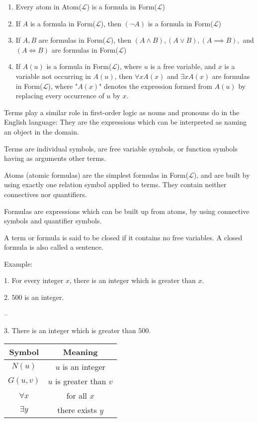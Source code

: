 \documentclass{article}
\begin{document}
\begin{enumerate}
    \item Every atom in Atom($\mathcal{L}$) is a formula in Form($\mathcal{L}$)
    \item If $A$ is a formula in Form($\mathcal{L}$), then $(\neg A)$ is a formula in Form($\mathcal{L}$)
    \item If $A, B$ are formulas in Form($\mathcal{L}$), then $(A \wedge B), (A \vee B), (A \implies B),$ and $(A \iff B)$ are formulas in Form($\mathcal{L}$)
    \item If $A(u)$ is a formula in Form($\mathcal{L}$), where $u$ is a free variable, and $x$ is a variable not occurring in $A(u)$, then $\forall x A(x)$ and $\exists x A(x)$ are formulas in Form($\mathcal{L}$), where "$A(x)$" denotes the expression formed from $A(u)$ by replacing every occurrence of $u$ by $x$.
\end{enumerate}

Terms play a similar role in first-order logic as nouns and pronouns do in the English language: They are the expressions which can be interpreted as naming an object in the domain.

Terms are individual symbols, are free variable symbols, or function symbols having as arguments other terms. 

Atoms (atomic formulas) are the simplest formulas in Form($\mathcal{L}$), and are built by using exactly one relation symbol applied to terms. They contain neither connectives nor quantifiers. 

Formulas are expressions which can be built up from atoms, by using connective symbols and quantifier symbols.

A term or formula is said to be closed if it contains no free variables. A closed formula is also called a sentence.

Example:

1. For every integer $x$, there is an integer which is greater than $x$.

2. $500$ is an integer.

--

3. There is an integer which is greater than $500$. 


\begin{table}[h]
    \centering
    \begin{tabular}{|c|c|} \hline
         Symbol& Meaning\\ \hline
         $N(u)$& $u$ is an integer\\
         $G(u,v)$& $u$ is greater than $v$\\
         $\forall x$& for all $x$\\
         $\exists y$& there exists $y$\\\hline
    \end{tabular}
\end{table}
\end{document}
